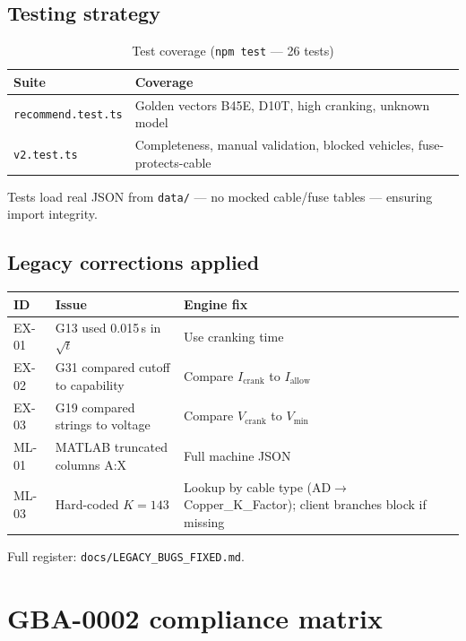 \documentclass[11pt,a4paper]{report}
\begin{document}
\section{Testing strategy}

\begin{table}[h]
  \centering
  \caption{Test coverage (\texttt{npm test} --- 26 tests)}
  \begin{tabular}{@{}ll@{}}
    \toprule
    Suite & Coverage \\
    \midrule
    \texttt{recommend.test.ts} & Golden vectors B45E, D10T, high cranking, unknown model \\
    \texttt{v2.test.ts} & Completeness, manual validation, blocked vehicles, fuse-protects-cable \\
    \bottomrule
  \end{tabular}
\end{table}

Tests load real JSON from \texttt{data/} --- no mocked cable/fuse tables --- ensuring import integrity.

\section{Legacy corrections applied}

\begin{table}[h]
  \centering
  \small
  \begin{tabular}{@{}p{1.2cm}p{4cm}p{7cm}@{}}
    \toprule
    ID & Issue & Engine fix \\
    \midrule
    EX-01 & G13 used 0.015\,s in $\sqrt{t}$ & Use cranking time \\
    EX-02 & G31 compared cutoff to capability & Compare $I_\mathrm{crank}$ to $I_\mathrm{allow}$ \\
    EX-03 & G19 compared strings to voltage & Compare $V_\mathrm{crank}$ to $V_\mathrm{min}$ \\
    ML-01 & MATLAB truncated columns A:X & Full machine JSON \\
    ML-03 & Hard-coded $K=143$ & Lookup by cable type (AD$\rightarrow$Copper\_K\_Factor); client branches block if missing \\
    \bottomrule
  \end{tabular}
\end{table}

Full register: \texttt{docs/LEGACY\_BUGS\_FIXED.md}.

\chapter{GBA-0002 compliance matrix}
\end{document}

